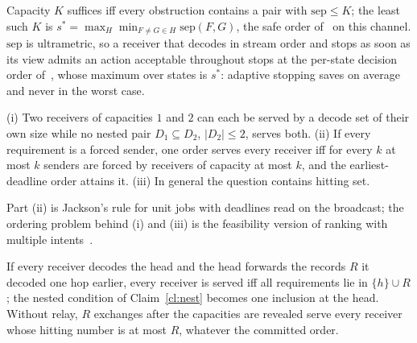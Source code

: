 \begin{claim}\label{cl:depth}
Capacity $K$ suffices iff every obstruction contains a pair with $\mathrm{sep}\le K$; the least such $K$ is
$s^\ast=\max_H\min_{F\ne G\in H}\mathrm{sep}(F,G)$, the safe order of~\cite{paperB} on this channel. $\mathrm{sep}$ is
ultrametric, so a receiver that decodes in stream order and stops as soon as its view admits an action acceptable
throughout stops at the per-state decision order of~\cite{paperB}, whose maximum over states is $s^\ast$: adaptive
stopping saves on average and never in the worst case.
\end{claim}

\begin{claim}\label{cl:nest}
(i) Two receivers of capacities $1$ and $2$ can each be served by a decode set of their own size while no nested pair
$D_1\subseteq D_2$, $|D_2|\le2$, serves both. (ii) If every requirement is a forced sender, one order serves every
receiver iff for every $k$ at most $k$ senders are forced by receivers of capacity at most $k$, and the
earliest-deadline order attains it. (iii) In general the question contains hitting set.
\end{claim}
Part (ii) is Jackson's rule for unit jobs with deadlines read on the broadcast; the ordering problem behind (i) and (iii)
is the feasibility version of ranking with multiple intents~\cite{azar2009,feige2004}.

\begin{claim}\label{cl:relaydepth}
If every receiver decodes the head and the head forwards the records $R$ it decoded one hop earlier, every receiver is
served iff all requirements lie in $\{h\}\cup R$; the nested condition of Claim~\ref{cl:nest} becomes one inclusion at the
head. Without relay, $R$ exchanges after the capacities are revealed serve every receiver whose hitting number is at most
$R$, whatever the committed order. 
\end{claim}


